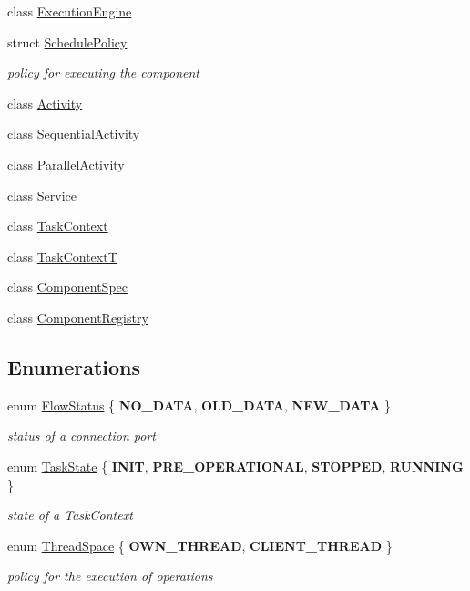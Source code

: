 \begin{DoxyCompactItemize}
class \hyperlink{classcoco_1_1_execution_engine}{Execution\-Engine}
\item 
struct \hyperlink{structcoco_1_1_schedule_policy}{Schedule\-Policy}
\begin{DoxyCompactList}\small\item\em policy for executing the component \end{DoxyCompactList}\item 
class \hyperlink{classcoco_1_1_activity}{Activity}
\item 
class \hyperlink{classcoco_1_1_sequential_activity}{Sequential\-Activity}
\item 
class \hyperlink{classcoco_1_1_parallel_activity}{Parallel\-Activity}
\item 
class \hyperlink{classcoco_1_1_service}{Service}
\item 
class \hyperlink{classcoco_1_1_task_context}{Task\-Context}
\item 
class \hyperlink{classcoco_1_1_task_context_t}{Task\-Context\-T}
\item 
class \hyperlink{classcoco_1_1_component_spec}{Component\-Spec}
\item 
class \hyperlink{classcoco_1_1_component_registry}{Component\-Registry}
\end{DoxyCompactItemize}
\subsection*{Enumerations}
\begin{DoxyCompactItemize}
\item 
enum \hyperlink{namespacecoco_a057be58377e415c9be98c1dc5c8426ad}{Flow\-Status} \{ {\bfseries N\-O\-\_\-\-D\-A\-T\-A}, 
{\bfseries O\-L\-D\-\_\-\-D\-A\-T\-A}, 
{\bfseries N\-E\-W\-\_\-\-D\-A\-T\-A}
 \}
\begin{DoxyCompactList}\small\item\em status of a connection port \end{DoxyCompactList}\item 
enum \hyperlink{namespacecoco_afec53814046619bac93c2077706a6bd1}{Task\-State} \{ {\bfseries I\-N\-I\-T}, 
{\bfseries P\-R\-E\-\_\-\-O\-P\-E\-R\-A\-T\-I\-O\-N\-A\-L}, 
{\bfseries S\-T\-O\-P\-P\-E\-D}, 
{\bfseries R\-U\-N\-N\-I\-N\-G}
 \}
\begin{DoxyCompactList}\small\item\em state of a Task\-Context \end{DoxyCompactList}\item 
enum \hyperlink{namespacecoco_ada9a67964012e198cdc20a86ae7cbdd5}{Thread\-Space} \{ {\bfseries O\-W\-N\-\_\-\-T\-H\-R\-E\-A\-D}, 
{\bfseries C\-L\-I\-E\-N\-T\-\_\-\-T\-H\-R\-E\-A\-D}
 \}
\begin{DoxyCompactList}\small\item\em policy for the execution of operations \end{DoxyCompactList}\end{DoxyCompactItemize}
